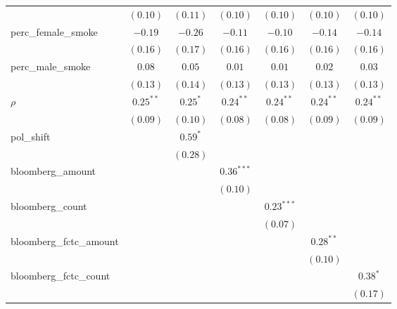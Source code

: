 \begin{table}[!h]
\begin{center}
\begin{tabular}{l c c c c c c }
                        & $(0.10)$     & $(0.11)$    & $(0.10)$     & $(0.10)$     & $(0.10)$     & $(0.10)$     \\
perc\_female\_smoke     & $-0.19$      & $-0.26$     & $-0.11$      & $-0.10$      & $-0.14$      & $-0.14$      \\
                        & $(0.16)$     & $(0.17)$    & $(0.16)$     & $(0.16)$     & $(0.16)$     & $(0.16)$     \\
perc\_male\_smoke       & $0.08$       & $0.05$      & $0.01$       & $0.01$       & $0.02$       & $0.03$       \\
                        & $(0.13)$     & $(0.14)$    & $(0.13)$     & $(0.13)$     & $(0.13)$     & $(0.13)$     \\
$\rho$                  & $0.25^{**}$  & $0.25^{*}$  & $0.24^{**}$  & $0.24^{**}$  & $0.24^{**}$  & $0.24^{**}$  \\
                        & $(0.09)$     & $(0.10)$    & $(0.08)$     & $(0.08)$     & $(0.09)$     & $(0.09)$     \\
pol\_shift              &              & $0.59^{*}$  &              &              &              &              \\
                        &              & $(0.28)$    &              &              &              &              \\
bloomberg\_amount       &              &             & $0.36^{***}$ &              &              &              \\
                        &              &             & $(0.10)$     &              &              &              \\
bloomberg\_count        &              &             &              & $0.23^{***}$ &              &              \\
                        &              &             &              & $(0.07)$     &              &              \\
bloomberg\_fctc\_amount &              &             &              &              & $0.28^{**}$  &              \\
                        &              &             &              &              & $(0.10)$     &              \\
bloomberg\_fctc\_count  &              &             &              &              &              & $0.38^{*}$   \\
                        &              &             &              &              &              & $(0.17)$     \\

\end{tabular}
\end{center}
\end{table}
